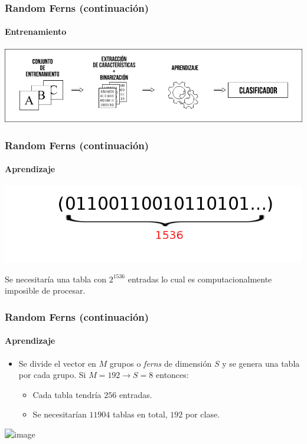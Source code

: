 		\begin{frame}
			\frametitle{Random Ferns (continuación)}
			\framesubtitle{Entrenamiento}
			\begin{center}
				\includegraphics[height=0.30\paperheight]{../img/pipeline_entrenamiento.jpg}
			\end{center}
		\end{frame}
		\begin{frame}
			\frametitle{Random Ferns (continuación)}
			\framesubtitle{Aprendizaje}
			\begin{center}
				\includegraphics[height=0.30\paperheight]{imgs/aprendizaje_1_1.png}
			\end{center}
			Se necesitaría una tabla con $2^{1536}$ entradas lo cual es computacionalmente imposible de procesar.
		\end{frame}
		\begin{frame}
			\frametitle{Random Ferns (continuación)}
			\framesubtitle{Aprendizaje}
			\begin{itemize}
				\item<1-> Se divide el vector en $M$ grupos o \textit{ferns} de dimensión $S$ y se genera una tabla por cada grupo. Si $M=192 \rightarrow S=8$ entonces:
				\begin{itemize}
					\item<2-> Cada tabla tendría $256$ entradas.
					\item<3-> Se necesitarían $11904$ tablas en total, $192$ por clase.
				\end{itemize}
			\end{itemize}
			\begin{center}
				\includegraphics<1->[height=0.8\paperheight]{imgs/aprendizaje_2.png}		
			\end{center}
		\end{frame}